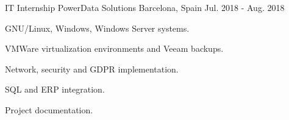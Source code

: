 \begin{cventries}

\cventry
{IT Internship} %
{PowerData Solutions} %
{Barcelona, Spain} %
{Jul. 2018 - Aug. 2018} %
{ %
\begin{cvitems}
\item {GNU/Linux, Windows, Windows Server systems.}
\item {VMWare virtualization environments and Veeam backups.}
\item {Network, security and GDPR implementation.}
\item {SQL and ERP integration.}
\item {Project documentation.}
\end{cvitems}
}


\end{cventries}